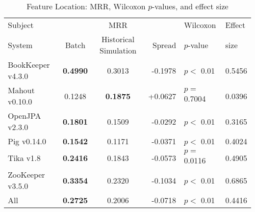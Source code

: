 \begin{table}[t]
\centering
\caption{Feature Location: MRR, Wilcoxon $p$-values, and effect size}
\begin{tabular}{l|ccr|ll}
\toprule
Subject & & MRR & & Wilcoxon & Effect \\
System  &  Batch & Historical Simulation & Spread & $p$-value & size \\
\midrule
BookKeeper v4.3.0 & {\bf 0.4990 } & 0.3013 & -0.1978 & $p < $ 0.01 & 0.5456 \\
Mahout v0.10.0 & 0.1248 & {\bf 0.1875 } & +0.0627 & $p = $ 0.7004 & 0.0396 \\
OpenJPA v2.3.0 & {\bf 0.1801 } & 0.1509 & -0.0292 & $p < $ 0.01 & 0.3165 \\
Pig v0.14.0 & {\bf 0.1542 } & 0.1171 & -0.0371 & $p < $ 0.01 & 0.4024 \\
Tika v1.8 & {\bf 0.2416 } & 0.1843 & -0.0573 & $p = $ 0.0116 & 0.4905 \\
ZooKeeper v3.5.0 & {\bf 0.3354 } & 0.2320 & -0.1034 & $p < $ 0.01 & 0.6865 \\
\midrule
All & {\bf 0.2725 } & 0.2006 & -0.0718 & $p < $ 0.01 & 0.4416 \\
\bottomrule
\end{tabular}
\label{table:feature_location_rq2}
\end{table}
